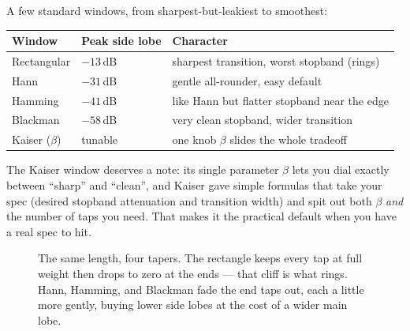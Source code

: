 A few standard windows, from sharpest-but-leakiest to smoothest:

\begin{center}
\renewcommand{\arraystretch}{1.25}
\begin{tabular}{p{2.8cm} p{3.2cm} p{6.2cm}}
\toprule
\textbf{Window} & \textbf{Peak side lobe} & \textbf{Character} \\
\midrule
Rectangular & $-13$\,dB & sharpest transition, worst stopband (rings) \\
Hann & $-31$\,dB & gentle all-rounder, easy default \\
Hamming & $-41$\,dB & like Hann but flatter stopband near the edge \\
Blackman & $-58$\,dB & very clean stopband, wider transition \\
Kaiser ($\beta$) & tunable & one knob $\beta$ slides the whole tradeoff \\
\bottomrule
\end{tabular}
\end{center}

The Kaiser window deserves a note: its single parameter $\beta$ lets you dial
exactly between ``sharp'' and ``clean'', and Kaiser gave simple formulas that take
your spec (desired stopband attenuation and transition width) and spit out both
$\beta$ \emph{and} the number of taps you need. That makes it the practical
default when you have a real spec to hit.

\begin{figure}[H]
\centering
{}
\caption{The same length, four tapers. The rectangle keeps every tap at full
weight then drops to zero at the ends --- that cliff is what rings. Hann, Hamming,
and Blackman fade the end taps out, each a little more gently, buying lower side
lobes at the cost of a wider main lobe.}
\label{ch16:fig-windows}
\end{figure}

